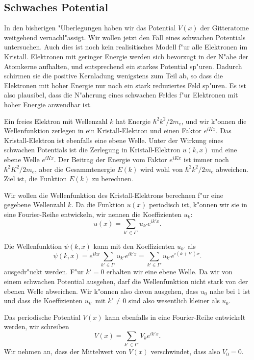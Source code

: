 \subsection{Schwaches Potential}
In den bisherigen "Uberlegungen haben wir das Potential $V(x)$ der Gitteratome
weitgehend vernachl"assigt.
Wir wollen jetzt den Fall eines schwachen Potentials untersuchen.
Auch dies ist noch kein realisitisches Modell f"ur alle Elektronen im 
Kristall. Elektronen mit geringer Energie werden sich bevorzugt in der
N"ahe der Atomkerne aufhalten, und entsprechend ein starkes Potential
sp"uren.
Dadurch schirmen sie die positive Kernladung wenigstens zum Teil ab, 
so dass die Elektronen mit hoher Energie nur noch ein stark reduziertes
Feld sp"uren. Es ist also plausibel, dass die N"aherung eines schwachen
Feldes f"ur Elektronen mit hoher Energie anwendbar ist.

Ein freies Elektron mit Wellenzahl $k$ hat Energie $\hbar^2k^2/2m_e$, und wir
k"onnen die Wellenfunktion zerlegen in ein Kristall-Elektron und einen
Faktor $e^{iKx}$.
Das Kristall-Elektron ist ebenfalls eine ebene Welle.
Unter der Wirkung eines schwachen Potentials ist die Zerlegung in
Kristall-Elektron $u(k,x)$ und eine ebene Welle $e^{iKx}$.
Der Beitrag der Energie vom Faktor $e^{iKx}$ ist immer noch $\hbar^2K^2/2m_e$,
aber die Gesammtenergie $E(k)$ wird wohl von $\hbar^2k^2/2m_e$ abweichen.
Ziel ist, die Funktion $E(k)$ zu berechnen.

Wir wollen die Wellenfunktion des Kristall-Elektrons berechnen 
f"ur eine gegebene Wellenzahl $k$.
Da die Funktion $u(x)$ periodisch ist, k"onnen wir sie in eine Fourier-Reihe
entwickeln, wir nennen die Koeffizienten $u_k$:
\[
u(x)=\sum_{k'\in\Gamma'} u_{k'} e^{ik'x}.
\]

Die Wellenfunktion $\psi(k,x)$ kann mit den Koeffizienten $u_{k'}$ als
\[
\psi(k,x)
=
e^{ikx}\sum_{k'\in\Gamma'}u_{k'}e^{ik'x}
=
\sum_{k'\in\Gamma'}u_{k'}e^{i(k+k')x}.
\]
ausgedr"uckt werden.
F"ur $k'=0$ erhalten wir eine ebene Welle.
Da wir von einem schwachen Potential ausgehen, darf die Wellenfunktion
nicht stark von der ebenen Welle abweichen. Wir k"onnen also davon ausgehen,
dass $u_0$ nahe bei $1$ ist und dass die Koeffizienten $u_{k'}$
mit $k'\ne 0$ sind also wesentlich kleiner als $u_0$.

Das periodische Potential $V(x)$ kann ebenfalls in eine Fourier-Reihe
entwickelt werden, wir schreiben
\[
V(x) = \sum_{k'\in\Gamma'}V_ke^{ik'x}.
\]
Wir nehmen an, dass der Mittelwert von $V(x)$ verschwindet, dass also $V_0=0$.

